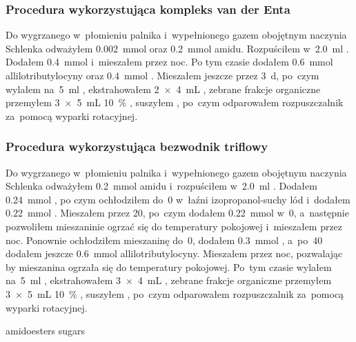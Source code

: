 \subsubsection{Procedura wykorzystująca kompleks van der Enta}\label{experimental:activation:van-der-ent}
Do wygrzanego w~płomieniu palnika i~wypełnionego gazem obojętnym naczynia Schlenka odważyłem
  \SI{0.002}{\mmol}  oraz \SI{0.2}{\mmol} amidu.
Rozpuściłem w~\SI{2.0}{\ml} .
Dodałem \SI{0.4}{\mmol}  i~mieszałem przez noc.
Po tym czasie dodałem \SI{0.6}{\mmol} allilotributylocyny oraz \SI{0.4}{\mmol} .
Mieszałem jeszcze przez \SI{3}{\day}, po~czym wylałem na~\SI{5}{\ml} ,
  ekstrahowałem \SI[product-units = single]{2 x 4}{\mL} , zebrane frakcje organiczne
  przemyłem \SI[product-units = single]{3 x 5}{\mL} \SI{10}{\percent} ,
  suszyłem , po~czym odparowałem rozpuszczalnik za~pomocą wyparki rotacyjnej.

\subsubsection{Procedura wykorzystująca bezwodnik triflowy}\label{experimental:activation:triflic}
Do wygrzanego w~płomieniu palnika i~wypełnionego gazem obojętnym naczynia Schlenka odważyłem
  \SI{0.2}{\mmol} amidu i~rozpuściłem w~\SI{2.0}{\ml} .
Dodałem \SI{0.24}{\mmol} , po czym ochłodziłem do~\SI{0}{\degC}
  w~łaźni izopropanol-suchy lód i~dodałem \SI{0.22}{\mmol} .
Mieszałem przez \SI{20}{\min}, po~czym dodałem \SI{0.22}{\mmol}  w~\SI{0}{\degC},
  a~następnie pozwoliłem mieszaninie ogrzać się do temperatury pokojowej i~mieszałem przez noc.
Ponownie ochłodziłem mieszaninę do~\SI{0}{\degC}, dodałem \SI{0.3}{\mmol} ,
  a~po~\SI{40}{\min} dodałem jeszcze \SI{0.6}{\mmol} allilotributylocyny.
Mieszałem przez noc, pozwalając by mieszanina ogrzała się do temperatury pokojowej.
Po~tym czasie wylałem na~\SI{5}{\ml} ,
  ekstrahowałem \SI[product-units = single]{3 x 4}{\mL} , zebrane frakcje organiczne
  przemyłem \SI[product-units = single]{3 x 5}{\mL} \SI{10}{\percent} ,
  suszyłem , po~czym odparowałem rozpuszczalnik za~pomocą wyparki rotacyjnej.

{amidoesters}
{sugars}
